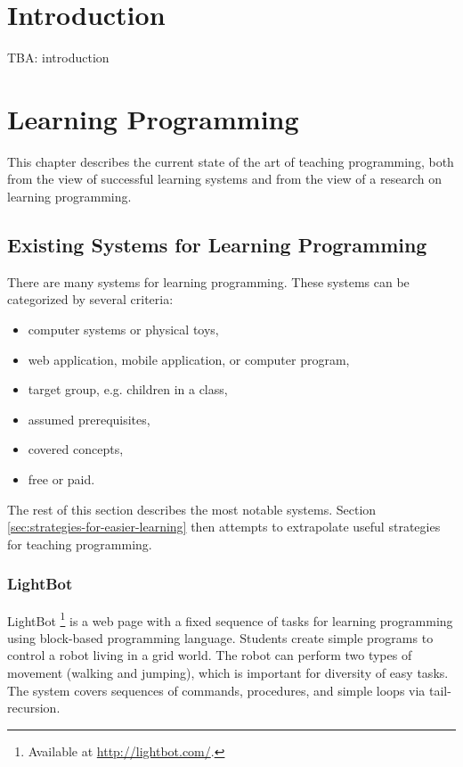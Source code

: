 \documentclass[
    digital,
    color,
    11pt,
    nocover,
    table,  %
    nolof,  %
    nolot,  %
    microtype,
]{fithesis3}
\begin{document}
\chapter{Introduction}
\label{chap:introduction}

TBA: introduction

\chapter{Learning Programming}
\label{chap:learning-programming}

This chapter describes the current state of the art of teaching programming, both from the view of successful learning systems and from the view of a research on learning programming.

\section{Existing Systems for Learning Programming}
\label{sec:existing-systems}

There are many systems for learning programming.
These systems can be categorized by several criteria:

\begin{itemize}
\item computer systems or physical toys,
\item web application, mobile application, or computer program,
\item target group, e.g. children in a class,
\item assumed prerequisites,
\item covered concepts, %
\item free or paid.
\end{itemize}

The rest of this section describes the most notable systems.
Section \ref{sec:strategies-for-easier-learning} then attempts to extrapolate useful strategies for teaching programming.


\subsection{LightBot}
\label{sec:lightbot}
LightBot%
\footnote{Available at \url{http://lightbot.com/}.}
is a web page with a fixed sequence of tasks for learning programming
using block-based programming language.
Students create simple programs to control a robot living in a grid world.
The robot can perform two types of movement (walking and jumping),
which is important for diversity of easy tasks.
The system covers sequences of commands, procedures, and simple loops via tail-recursion.
\end{document}

